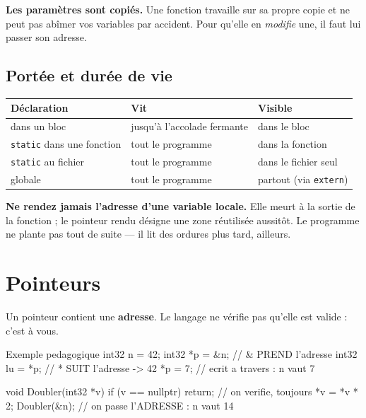 \begin{nkretenir}
\textbf{Les paramètres sont copiés.} Une fonction travaille sur sa propre copie
et ne peut pas abîmer vos variables par accident. Pour qu'elle en \emph{modifie}
une, il faut lui passer son adresse.
\end{nkretenir}

\subsection{Portée et durée de vie}

\begin{center}
\begin{tabular}{@{}lll@{}}
\toprule
\textbf{Déclaration} & \textbf{Vit} & \textbf{Visible} \\
\midrule
dans un bloc & jusqu'à l'accolade fermante & dans le bloc \\
\texttt{static} dans une fonction & tout le programme & dans la fonction \\
\texttt{static} au fichier & tout le programme & dans le fichier seul \\
globale & tout le programme & partout (via \texttt{extern}) \\
\bottomrule
\end{tabular}
\end{center}

\begin{nkpiege}
\textbf{Ne rendez jamais l'adresse d'une variable locale.} Elle meurt à la sortie
de la fonction ; le pointeur rendu désigne une zone réutilisée aussitôt. Le
programme ne plante pas tout de suite --- il lit des ordures plus tard, ailleurs.
\end{nkpiege}

\section{Pointeurs}

Un pointeur contient une \textbf{adresse}. Le langage ne vérifie pas qu'elle est
valide : c'est à vous.

\begin{nkcode}{Exemple pedagogique}
int32  n  = 42;
int32 *p  = &n;    // & PREND l'adresse
int32  lu = *p;    // * SUIT l'adresse -> 42
*p = 7;            // ecrit a travers : n vaut 7

void Doubler(int32 *v) {
    if (v == nullptr) { return; }   // on verifie, toujours
    *v = *v * 2;
}
Doubler(&n);       // on passe l'ADRESSE : n vaut 14
\end{nkcode}

